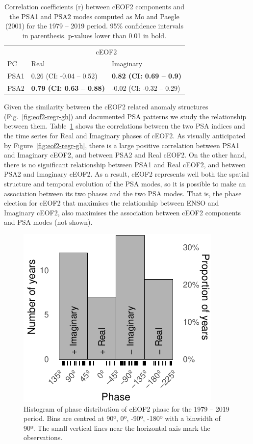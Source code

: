 \documentclass[smallextended]{svjour3}       %
\begin{document}
\begin{table}

\caption{\label{tab:psa-eof2}Correlation coefficients (r) between cEOF2 components and the PSA1 and PSA2 modes computed as Mo and Paegle (2001) for the 1979 -- 2019 period. 95\% confidence intervals in parenthesis. p-values lower than 0.01 in bold.}
\centering
\begin{tabular}[t]{l>{}l>{}l}
\toprule
\multicolumn{1}{c}{} & \multicolumn{2}{c}{cEOF2} \\
\cmidrule(l{3pt}r{3pt}){2-3}
PC & Real & Imaginary\\
\midrule
PSA1 & 0.26 (CI: -0.04 -- 0.52) & \textbf{0.82 (CI: 0.69 -- 0.9)}\\
PSA2 & \textbf{0.79 (CI: 0.63 -- 0.88)} & -0.02 (CI: -0.32 -- 0.29)\\
\bottomrule
\end{tabular}
\end{table}

Given the similarity between the cEOF2 related anomaly structures (Fig.~\ref{fig:eof2-regr-gh}) and documented PSA patterns we study the relationship between them.
Table~\ref{tab:psa-eof2} shows the correlations between the two PSA indices and the time series for Real and Imaginary phases of cEOF2.
As visually anticipated by Figure~\ref{fig:eof2-regr-gh}, there is a large positive correlation between PSA1 and Imaginary cEOF2, and between PSA2 and Real cEOF2.
On the other hand, there is no significant relationship between PSA1 and Real cEOF2, and between PSA2 and Imaginary cEOF2.
As a result, cEOF2 represents well both the spatial structure and temporal evolution of the PSA modes, so it is possible to make an association between its two phases and the two PSA modes.
That is, the phase election for cEOF2 that maximises the relationship between ENSO and Imaginary cEOF2, also maximises the association between cEOF2 components and PSA modes (not shown).



\begin{figure}
\centering
\includegraphics{../figures/phase-histogram-1.pdf}
\caption{\label{fig:phase-histogram}Histogram of phase distribution of cEOF2 phase for the 1979 -- 2019 period. Bins are centred at 90º, 0º, -90º, -180º with a binwidth of 90º. The small vertical lines near the horizontal axis mark the observations.}
\end{figure}
\end{document}
